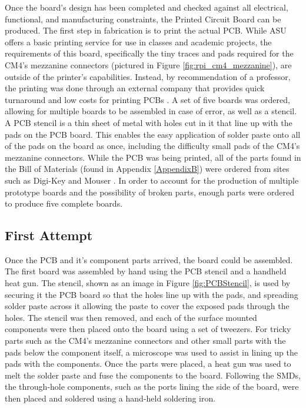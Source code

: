 Once the board's design has been completed and checked against all electrical, functional, and manufacturing constraints, the Printed Circuit Board can be produced.
The first step in fabrication is to print the actual PCB.
While ASU offers a basic printing service for use in classes and academic projects, the requirements of this board, specifically the tiny traces and pads required for the CM4's mezzanine connectors (pictured in Figure \ref{fig:rpi_cm4_mezzanine}), are outside of the printer's capabilities.
Instead, by recommendation of a professor, the printing was done through an external company that provides quick turnaround and low costs for printing PCBs \cite{jlcpcb}.
A set of five boards was ordered, allowing for multiple boards to be assembled in case of error, as well as a stencil.
A PCB stencil is a thin sheet of metal with holes cut in it that line up with the pads on the PCB board.
This enables the easy application of solder paste onto all of the pads on the board as once, including the difficulty small pads of the CM4's mezzanine connectors.
While the PCB was being printed, all of the parts found in the Bill of Materials (found in Appendix \ref{AppendixB}) were ordered from sites such as Digi-Key and Mouser \cite{digikey,mouser}.
In order to account for the production of multiple prototype boards and the possibility of broken parts, enough parts were ordered to produce five complete boards.

\subsection{First Attempt}\label{subsec:Manufacturing1}

Once the PCB and it's component parts arrived, the board could be assembled.
The first board was assembled by hand using the PCB stencil and a handheld heat gun.
The stencil, shown as an image in Figure \ref{fig:PCBStencil}, is used by securing it the PCB board so that the holes line up with the pads, and spreading solder paste across it allowing the paste to cover the exposed pads through the holes.
The stencil was then removed, and each of the surface mounted components were then placed onto the board using a set of tweezers.
For tricky parts such as the CM4's mezzanine connectors and other small parts with the pads below the component itself, a microscope was used to assist in lining up the pads with the components.
Once the parts were placed, a heat gun was used to melt the solder paste and fuse the components to the board.
Following the SMDs, the through-hole components, such as the ports lining the side of the board, were then placed and soldered using a hand-held soldering iron.

